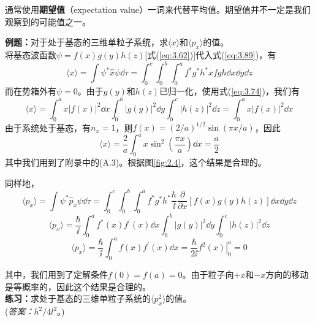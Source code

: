 	通常使用\textbf{期望值}（expectation value）一词来代替平均值。期望值并不一定是我们观察到的可能值之一。
	\begin{examplebox}
		\textbf{例题：}对于处于基态的三维单粒子系统，求$\langle x \rangle$和$\langle p_x \rangle$的值。\\
		
		将基态波函数$\psi=f\left(x\right)g\left(y\right)h\left(z\right)$[式(\ref{eq:3.62})]代入式(\ref{eq:3.89})，有
		\begin{equation*}
			\langle x \rangle = \int \psi^{\ast}\hat{x}\psi \dd \tau = \int_{0}^{c}\int_{0}^{b}\int_{0}^{a}f^{\ast}g^{\ast}h^{\ast} x fgh\dd x\dd y\dd z
		\end{equation*}
		而在势箱外有$\psi = 0$。由于$g\left(y\right)$和$h\left(z\right)$已归一化，使用式(\ref{eq:3.74})，我们有
		\begin{equation*}
			\langle x \rangle = \int_{0}^{a} x\left|f\left(x\right)\right|^{2}\dd x \int_{0}^{b}\left|g\left(y\right)\right|^{2}\dd y \int_{0}^{c}\left|h\left(z\right)\right|^{2}\dd z = \int_{0}^{a} x\left|f\left(x\right)\right|^{2}\dd x
		\end{equation*}
		由于系统处于基态，有$n_x=1$，则$f\left(x\right) = \left(2/a\right)^{1/2}\sin\left(\pi x/a\right)$，因此
		\begin{equation}
			\langle x \rangle = \frac{2}{a}\int_{0}^{a} x\sin^{2}\left(\frac{\pi x}{a}\right)\dd x = \frac{a}{2}
			\label{eq:3.91}
		\end{equation}
		其中我们用到了附录中的(A.3)。根据图\ref{fig:2.4}，这个结果是合理的。

		同样地，
		\begin{equation*}
			\langle p_x \rangle = \int \psi^{\ast}\hat{p}_x\psi \dd \tau = \int_{0}^{c}\int_{0}^{b}\int_{0}^{a}f^{\ast}g^{\ast}h^{\ast} \frac{\hbar}{\ii }\frac{\partial}{\partial x}\left[f\left(x\right)g\left(y\right)h\left(z\right)\right]\dd x\dd y\dd z
		\end{equation*}
		\begin{equation*}
			\langle p_x \rangle = \frac{\hbar}{\ii }\int_{0}^{a}f^{\ast}\left(x\right)f^{\prime}\left(x\right)\dd x \int_{0}^{b}\left|g\left(y\right)\right|^{2}\dd y \int_{0}^{c}\left|h\left(z\right)\right|^{2}\dd z
		\end{equation*}
		\begin{equation}
			\langle p_x \rangle = \frac{\hbar}{\ii }\int_{0}^{a}f\left(x\right)f^{\prime}\left(x\right)\dd x = \frac{\hbar}{2\ii }\left. f^2\left(x\right) \right|_{0}^{a} = 0
			\label{eq:3.92}
		\end{equation}

		其中，我们用到了定解条件$f\left(0\right)=f\left(a\right)=0$。由于粒子向$+x$和$-x$方向的移动是等概率的，因此这个结果是合理的。\\
		
		\textbf{练习：}求处于基态的三维单粒子系统的$\langle p_x^2 \rangle$的值。\\
		(\textit{答案：}$h^2/4l^2$。)
	\end{examplebox}

